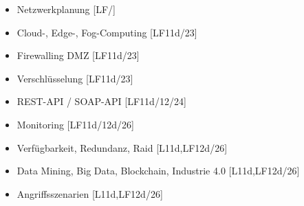 \begin{frame}
\begin{tiny}
\begin{columns}[T]
\begin{itemize}
      \item[\faSquareO] Netzwerkplanung [LF/]
      \item[\faSquareO] Cloud-, Edge-, Fog-Computing [LF11d/23]
      \item[\faSquareO] Firewalling DMZ [LF11d/23]
      \item[\faSquareO] Verschlüsselung [LF11d/23]
      \item[\faSquareO] REST-API / SOAP-API [LF11d/12/24]
      \item[\faSquareO] Monitoring [LF11d/12d/26]
      \item[\faSquareO] Verfügbarkeit, Redundanz, Raid [L11d,LF12d/26]
      \item[\faSquareO] Data Mining, Big Data, Blockchain, Industrie 4.0 [L11d,LF12d/26]
      \item[\faSquareO] Angriffsszenarien [L11d,LF12d/26]
    \end{itemize}
  \end{columns}
  \end{tiny}
\end{frame}
